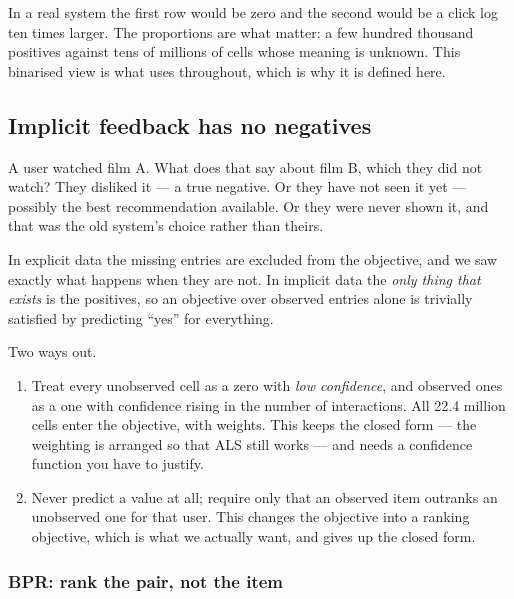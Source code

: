 \documentclass[11pt,a4paper]{article}
\begin{document}
In a real system the first row would be zero and the second would be a click
log ten times larger. The proportions are what matter: a few hundred thousand
positives against tens of millions of cells whose meaning is unknown. This
binarised view is what  uses throughout, which is why it is defined
here.

\subsection{Implicit feedback has no negatives}

A user watched film A. What does that say about film B, which they did not
watch? They disliked it --- a true negative. Or they have not seen it yet ---
possibly the best recommendation available. Or they were never shown it, and
that was the old system's choice rather than theirs.

\begin{failbox}[title={The whole difficulty}]
In explicit data the missing entries are excluded from the objective, and we
saw exactly what happens when they are not. In implicit data the \emph{only
thing that exists} is the positives, so an objective over observed entries
alone is trivially satisfied by predicting ``yes'' for everything.
\end{failbox}

Two ways out.

\begin{enumerate}[leftmargin=*]
  \item {} Treat every unobserved
        cell as a zero with \emph{low confidence}, and observed ones as a one
        with confidence rising in the number of interactions. All 22.4 million
        cells enter the objective, with weights. This keeps the closed form ---
        the weighting is arranged so that ALS still works --- and needs a
        confidence function you have to justify.
  \item {} Never predict a value at all; require only
        that an observed item outranks an unobserved one for that user. This
        changes the objective into a ranking objective, which is what we
        actually want, and gives up the closed form.
\end{enumerate}

\subsubsection{BPR: rank the pair, not the item}
\end{document}
